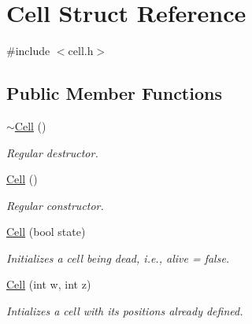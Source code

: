 \hypertarget{structCell}{}\section{Cell Struct Reference}
\label{structCell}


{\ttfamily \#include $<$cell.\+h$>$}

\subsection*{Public Member Functions}
\begin{DoxyCompactItemize}
\item 
\mbox{\label{structCell_a9fa559f7a28e2b4336c6879ca09304d8}} 
\hyperlink{structCell_a9fa559f7a28e2b4336c6879ca09304d8}{$\sim$\+Cell} ()
\begin{DoxyCompactList}\small\item\em Regular destructor. \end{DoxyCompactList}\item 
\mbox{\label{structCell_a394510643e8664cf12b5efaf5cb99f71}} 
\hyperlink{structCell_a394510643e8664cf12b5efaf5cb99f71}{Cell} ()
\begin{DoxyCompactList}\small\item\em Regular constructor. \end{DoxyCompactList}\item 
\mbox{\label{structCell_a968ecc9417451e4beaf97bbfde92a366}} 
\hyperlink{structCell_a968ecc9417451e4beaf97bbfde92a366}{Cell} (bool state)
\begin{DoxyCompactList}\small\item\em Initializes a cell being dead, i.\+e., alive = false. \end{DoxyCompactList}\item 
\mbox{\label{structCell_a2d7ba9c9eaceb064abb8936fcfbe1e75}} 
\hyperlink{structCell_a2d7ba9c9eaceb064abb8936fcfbe1e75}{Cell} (int w, int z)
\begin{DoxyCompactList}\small\item\em Intializes a cell with its positions already defined. \end{DoxyCompactList}\item 
\mbox{\label{structCell_a3135350198f9e8029260b2468810db9a}} 

\end{DoxyCompactItemize}
